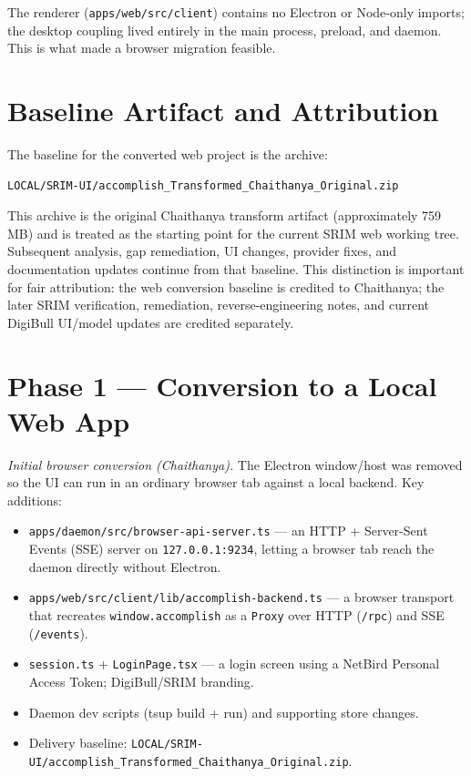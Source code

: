 \documentclass[11pt,a4paper]{article}
\begin{document}
The renderer (\texttt{apps/web/src/client}) contains no Electron or Node-only
imports; the desktop coupling lived entirely in the main process, preload, and
daemon. This is what made a browser migration feasible.

\section{Baseline Artifact and Attribution}
The baseline for the converted web project is the archive:

\begin{lstlisting}
LOCAL/SRIM-UI/accomplish_Transformed_Chaithanya_Original.zip
\end{lstlisting}

This archive is the original Chaithanya transform artifact (approximately
759 MB) and is treated as the starting point for the current SRIM web working
tree. Subsequent analysis, gap remediation, UI changes, provider fixes, and
documentation updates continue from that baseline. This distinction is important
for fair attribution: the web conversion baseline is credited to Chaithanya; the
later SRIM verification, remediation, reverse-engineering notes, and current
DigiBull UI/model updates are credited separately.

\section{Phase 1 --- Conversion to a Local Web App}
\emph{Initial browser conversion (Chaithanya).} The Electron window/host was
removed so the UI can run in an ordinary browser tab against a local backend.
Key additions:

\begin{itemize}[leftmargin=1.4em,topsep=2pt]
  \item \texttt{apps/daemon/src/browser-api-server.ts} --- an HTTP + Server-Sent
        Events (SSE) server on \verb|127.0.0.1:9234|, letting a browser tab reach
        the daemon directly without Electron.
  \item \texttt{apps/web/src/client/lib/accomplish-backend.ts} --- a browser
        transport that recreates \verb|window.accomplish| as a \verb|Proxy| over
        HTTP (\verb|/rpc|) and SSE (\verb|/events|).
  \item \texttt{session.ts} + \texttt{LoginPage.tsx} --- a login screen using a
        NetBird Personal Access Token; DigiBull/SRIM branding.
  \item Daemon dev scripts (tsup build + run) and supporting store changes.
  \item Delivery baseline:
        \verb|LOCAL/SRIM-UI/accomplish_Transformed_Chaithanya_Original.zip|.
\end{itemize}
\end{document}
